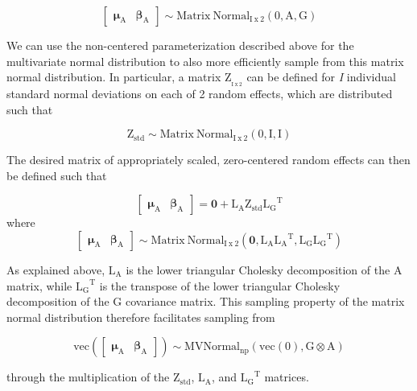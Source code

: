 \documentclass[
]{book}
\begin{document}
\[ \begin{bmatrix}
\boldsymbol{\mu_{\mathrm{A}}} &
\boldsymbol{\beta_{\mathrm{A}}} 
\end{bmatrix}
\sim \mathrm{Matrix\ Normal_{I \ x \ 2}}(\boldsymbol{\mathrm{0}}, \boldsymbol{\mathrm{A}}, \boldsymbol{\mathrm{G}}) \]

We can use the non-centered parameterization described above for the multivariate normal distribution to also more efficiently sample from this matrix normal distribution. In particular, a matrix \(\boldsymbol{\mathrm{Z_{_{I \ x \ 2}}}}\) can be defined for \emph{I} individual standard normal deviations on each of 2 random effects, which are distributed such that

\[\boldsymbol{\mathrm{Z_{std}}}
\sim \mathrm{Matrix\ Normal_{I \ x \ 2}}(\boldsymbol{\mathrm{0}}, \boldsymbol{\mathrm{I}}, \boldsymbol{\mathrm{I}}) \]

The desired matrix of appropriately scaled, zero-centered random effects can then be defined such that

\[\begin{bmatrix}
\boldsymbol{\mu_{\mathrm{A}}} &
\boldsymbol{\beta_{\mathrm{A}}} 
\end{bmatrix}
= \boldsymbol{0}+\boldsymbol{\mathrm{L_A}}
\boldsymbol{\mathrm{Z_{std}}}
\boldsymbol{\mathrm{L_G}}^{\mathrm{T}}\]
where
\[\begin{bmatrix}
\boldsymbol{\mu_{\mathrm{A}}} &
\boldsymbol{\beta_{\mathrm{A}}} 
\end{bmatrix}
\sim  \mathrm{Matrix\ Normal_{I \ x \ 2}}(\boldsymbol{0},
\boldsymbol{\mathrm{L_A}} \boldsymbol{\mathrm{L_A}}^{\mathrm{T}},
\boldsymbol{\mathrm{L_G}} \boldsymbol{\mathrm{L_G}}^{\mathrm{T}} )\]

As explained above, \(\boldsymbol{\mathrm{L_A}}\) is the lower triangular Cholesky decomposition of the \(\boldsymbol{\mathrm{A}}\) matrix, while \(\boldsymbol{\mathrm{L_G}}^{\mathrm{T}}\) is the transpose of the lower triangular Cholesky decomposition of the \(\boldsymbol{\mathrm{G}}\) covariance matrix. This sampling property of the matrix normal distribution therefore facilitates sampling from

\[ \mathrm{vec}( 
\begin{bmatrix}
\boldsymbol{\mu_{\mathrm{A}}} &
\boldsymbol{\beta_{\mathrm{A}}} 
\end{bmatrix}
)
\sim \mathrm{MVNormal_{np}}(\mathrm{vec}(\boldsymbol{\mathrm{0}}),  \boldsymbol{\mathrm{G}} \otimes \boldsymbol{\mathrm{A}} )\]

through the multiplication of the \(\boldsymbol{\mathrm{Z_{std}}}\), \(\boldsymbol{\mathrm{L_A}}\), and \(\boldsymbol{\mathrm{L_G}}^{\mathrm{T}}\) matrices.
\end{document}
